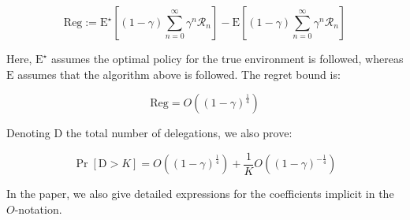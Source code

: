 \documentclass[a0paper,portrait]{baposter}
\begin{document}
\begin{poster}
{$$\mathrm{Reg}:=\mathrm{E}^\star\left[(1-\gamma)\sum_{n=0}^\infty {\gamma^n \mathcal{R}_n}\right]-\mathrm{E}\left[(1-\gamma)\sum_{n=0}^\infty {\gamma^n \mathcal{R}_n}\right]$$

Here, $\mathrm{E}^\star$ assumes the optimal policy for the true environment is followed, whereas $\mathrm{E}$ assumes that the algorithm above is followed. The regret bound is:

$$\mathrm{Reg}=O\left((1-\gamma)^{\frac{1}{4}}\right)$$

Denoting $\mathrm{D}$ the total number of delegations, we also prove:

$$\Pr\left[\mathrm{D}>K\right]=O\left((1-\gamma)^{\frac{1}{4}}\right)+\frac{1}{K}O\left((1-\gamma)^{-\frac{1}{4}}\right)$$

In the paper, we also give detailed expressions for the coefficients implicit in the $O$-notation.
}

\end{poster}
\end{document}
